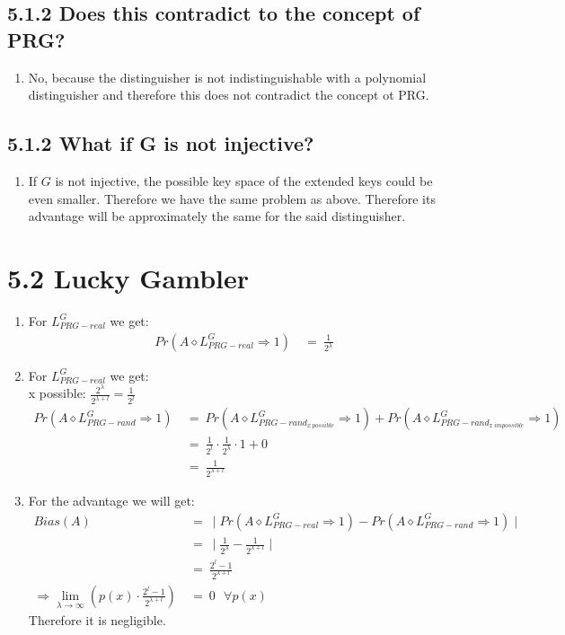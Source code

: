 \documentclass{report}
\begin{document}
	\subsection*{5.1.2 Does this contradict to the concept of PRG?}
		\begin{enumerate}[]
			\item No, because the distinguisher is not indistinguishable with a polynomial distinguisher and therefore this does not contradict the concept ot PRG.
		\end{enumerate}
	\subsection*{5.1.2 What if G is not injective?}
		\begin{enumerate}[]
			\item If $G$ is not injective, the possible key space of the extended keys could be even smaller. Therefore we have the same problem as above. Therefore its advantage will be approximately the same for the said distinguisher.
		\end{enumerate}
	\newpage
	\section*{5.2 Lucky Gambler}
		\begin{enumerate}[]
			\item For $L_{PRG-real}^G$ we get:
			\begin{align*}
				Pr( A \diamond L_{PRG-real}^G \Rightarrow 1 ) \ & = \ \frac{1}{2^{\lambda}}
			\end{align*}
			\item For $L_{PRG-real}^G$ we get: \\
			x possible: $\frac{2^{\lambda}}{2^{\lambda + l}} = \frac{1}{2^{l}}$
			\begin{align*}
				Pr( A \diamond L_{PRG-rand}^G \Rightarrow 1 ) \ & = \ Pr( A \diamond L_{PRG-rand_{x \ possible}}^G \Rightarrow 1 ) + Pr( A \diamond L_{PRG-rand_{x \ impossible}}^G \Rightarrow 1 ) \\
				& = \ \frac{1}{2^{l}} \cdot \frac{1}{2^{\lambda}} \cdot 1 + 0 \\
				& = \ \frac{1}{2^{\lambda + l}}
			\end{align*}
			\item For the advantage we will get:
			\begin{align*}
				Bias(A) \ & = \ \mid Pr( A \diamond L_{PRG-real}^G \Rightarrow 1 ) - Pr( A \diamond L_{PRG-rand}^G \Rightarrow 1 ) \mid \\
				& = \ \mid \frac{1}{2^{\lambda}} - \frac{1}{2^{\lambda + l}} \mid \\
				& = \ \frac{2^l -1}{2^{\lambda + l}}\\
				\Rightarrow \lim_{\lambda \rightarrow \infty}(p(x) \cdot \frac{2^l -1}{2^{\lambda + l}}) \ & = \ 0 \ \ \ \forall	 p(x)
			\end{align*}
			Therefore it is negligible.
		\end{enumerate}
	\newpage
\end{document}
